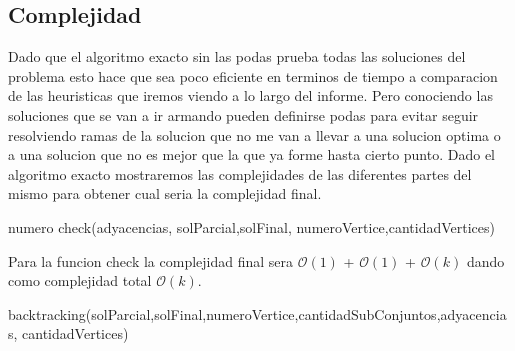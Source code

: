 \subsection{Complejidad}
Dado que el algoritmo exacto sin las podas prueba todas las soluciones del problema esto hace que sea poco eficiente en terminos de tiempo a comparacion de las heuristicas que iremos viendo a lo largo del informe. Pero conociendo las soluciones que se van a ir armando pueden definirse podas para evitar seguir resolviendo ramas de la solucion que no me van a llevar a una solucion optima o a una solucion que no es mejor que la que ya forme hasta cierto punto.
Dado el algoritmo exacto mostraremos las complejidades de las diferentes partes del mismo para obtener cual seria la complejidad final.

\begin{algorithm}
  \begin{algorithmic}[1]\parskip=1mm
 \caption{numero check(adyacencias, solParcial,solFinal, numeroVertice,cantidadVertices)}
  \end{algorithmic}
  \end{algorithm}

Para la funcion check la complejidad final sera $\mathcal{O}(1)$ + $\mathcal{O}(1)$ + $\mathcal{O}(k)$ dando como complejidad total $\mathcal{O}(k)$.

\begin{algorithm}
 \begin{algorithmic}[1]\parskip=1mm
 \caption{backtracking(solParcial,solFinal,numeroVertice,cantidadSubConjuntos,adyacencias, cantidadVertices)}
  \end{algorithmic}
  \end{algorithm}

